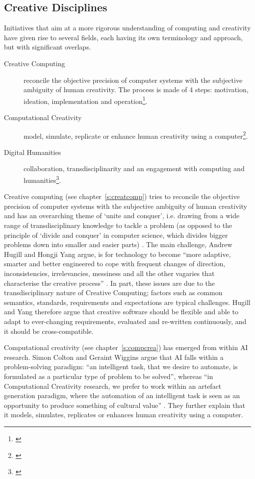 \subsection{Creative Disciplines}

Initiatives that aim at a more rigorous understanding of computing and creativity have given rise to several fields, each having its own terminology and approach, but with significant overlaps.

\begin{description}
  \item [Creative Computing] reconcile the objective precision of computer systems with the subjective ambiguity of human creativity. The process is made of 4 steps: motivation, ideation, implementation and operation\footnote{\autocite{Hugill2013c}}.
  \item [Computational Creativity] model, simulate, replicate or enhance human creativity using a computer\footnote{\autocite{Colton2012}}.
  \item [Digital Humanities] collaboration, transdisciplinarity and an engagement with computing and humanities\footnote{\autocite{Burdick2012}}.
\end{description}

Creative computing (see chapter~\ref{s:creatcomp}) tries to reconcile the objective precision of computer systems with the subjective ambiguity of human creativity \autocite{Hugill2013c} and has an overarching theme of `unite and conquer', i.e. drawing from a wide range of transdisciplinary knowledge to tackle a problem (as opposed to the principle of `divide and conquer' in computer science, which divides bigger problems down into smaller and easier parts) \autocite{Yang2013}. The main challenge, Andrew Hugill and Hongji Yang argue, is for technology to become ``more adaptive, smarter and better engineered to cope with frequent changes of direction, inconsistencies, irrelevancies, messiness and all the other vagaries that characterise the creative process'' \autocite{Hugill2013c}. In part, these issues are due to the transdisciplinary nature of Creative Computing; factors such as common semantics, standards, requirements and expectations are typical challenges. Hugill and Yang therefore argue that creative software should be flexible and able to adapt to ever-changing requirements, evaluated and re-written continuously, and it should be cross-compatible.

Computational creativity (see chapter~\ref{s:compcrea}) has emerged from within \ac{AI} research. Simon Colton and Geraint Wiggins argue that \ac{AI} falls within a problem-solving paradigm: ``an intelligent task, that we desire to automate, is formulated as a particular type of problem to be solved'', whereas ``in Computational Creativity research, we prefer to work within an artefact generation paradigm, where the automation of an intelligent task is seen as an opportunity to produce something of cultural value'' \citeyear{Colton2012}. They further explain that it models, simulates, replicates or enhances human creativity using a computer.

